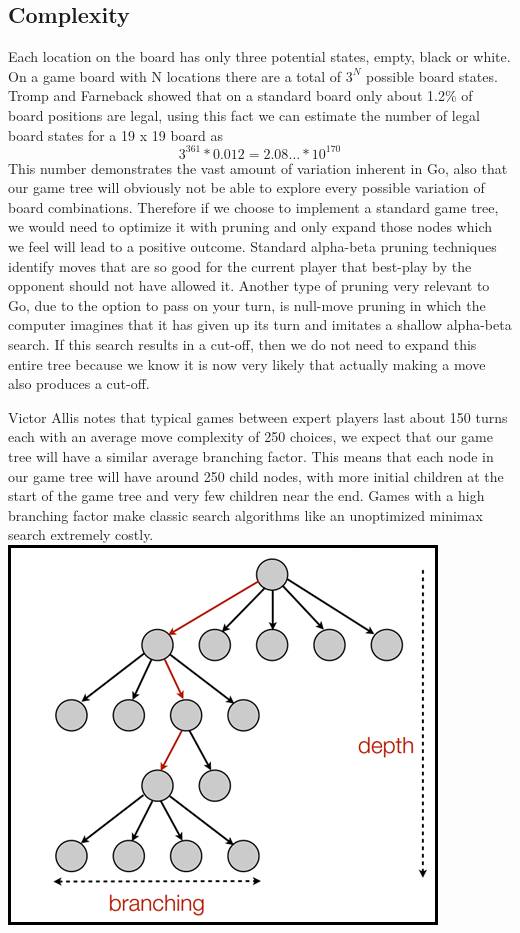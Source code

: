 \documentclass[conference]{IEEEtran}
\begin{document}
\subsection{Complexity}
Each location on the board has only three potential states, empty, black or white. On a game board with N locations there are a total of $3^N$ possible board states. Tromp and Farneback showed that on a standard board only about 1.2\% of board positions are legal, using this fact we can estimate the number of legal board states for a 19 x 19 board as \[3^{361} * 0.012 = 2.08\dots * 10^{170}\]This number demonstrates the vast amount of variation inherent in Go, also that our game tree will obviously not be able to explore every possible variation of board combinations. Therefore if we choose to implement a standard game tree, we would need to optimize it with pruning and only expand those nodes which we feel will lead to a positive outcome. Standard alpha-beta pruning techniques identify moves that are so good for the current player that best-play by the opponent should not have allowed it. Another type of pruning very relevant to Go, due to the option to pass on your turn, is null-move pruning in which the computer imagines that it has given up its turn and imitates a shallow alpha-beta search. If this search results in a cut-off, then we do not need to expand this entire tree because we know it is now very likely that actually making a move also produces a cut-off.\par
Victor Allis notes that typical games between expert players last about 150 turns each with an average move complexity of 250 choices, we expect that our game tree will have a similar average branching factor. This means that each node in our game tree will have around 250 child nodes, with more initial children at the start of the game tree and very few children near the end. Games with a high branching factor make classic search algorithms like an unoptimized minimax search extremely costly.
\includegraphics{branching}
\end{document}
